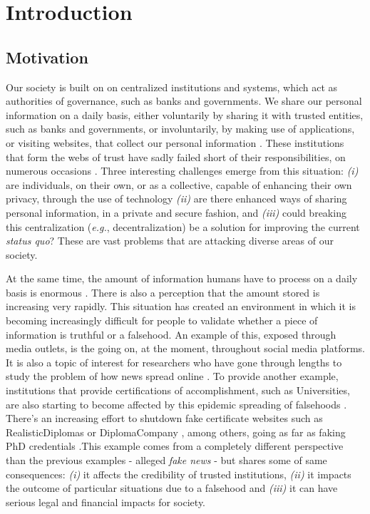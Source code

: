 \chapter{Introduction}
\label{chap:intro}

\section{Motivation}
\label{sec:intro-motivation}

Our society is built on on centralized institutions and systems, which act as authorities of governance, such as banks and governments. We share our personal information on a daily basis, either voluntarily by sharing it with trusted entities, such as banks and governments, or involuntarily, by making use of applications, or visiting websites, that collect our personal information \cite{debatin_facebook_2009, choi_embarrassing_2015, shilton_four_nodate}. These institutions that form the webs of trust have sadly failed short of their responsibilities, on numerous occasions \cite{gibbs_facebook_2014, ivashina_bank_2010, marthews_government_2017}. Three interesting challenges emerge from this situation: \emph{(i)} are individuals, on their own, or as a collective, capable of enhancing their own privacy, through the use of technology \emph{(ii)} are there enhanced ways of sharing personal information, in a private and secure fashion, and \emph{(iii)} could breaking this centralization (\textit{e.g.}, decentralization) be a solution for improving the current \textit{status quo}? These are vast problems that are attacking diverse areas of our society.

At the same time, the amount of information humans have to process on a daily basis is enormous \cite{hilbert_worlds_2011, lee_information_2016}. There is also a perception that the amount stored is increasing very rapidly. This situation has created an environment in which it is becoming increasingly difficult for people to validate whether a piece of information is truthful or a falsehood. An example of this, exposed through media outlets, is the  going on, at the moment, throughout social media platforms. It is also a topic of interest for researchers who have gone through lengths to study the problem of how news spread online \cite{vosoughi_spread_2018}. To provide another example, institutions that provide certifications of accomplishment, such as Universities, are also starting to become affected by this epidemic spreading of falsehoods \cite{lam_how_2017}. There’s an increasing effort to shutdown fake certificate websites \cite{camilla_telegraph} such as RealisticDiplomas \cite{RealisticDiplomas} or DiplomaCompany \cite{DiplomaCompany}, among others, going as far as faking PhD credentials \cite{doctoroff_tang_2010}.This example comes from a completely different perspective than the previous examples - alleged \textit{fake news} - but shares some of same consequences: \emph{(i)} it affects the credibility of trusted institutions, \emph{(ii)} it impacts the outcome of particular situations due to a falsehood and \emph{(iii)} it can have serious legal and financial impacts for society.

